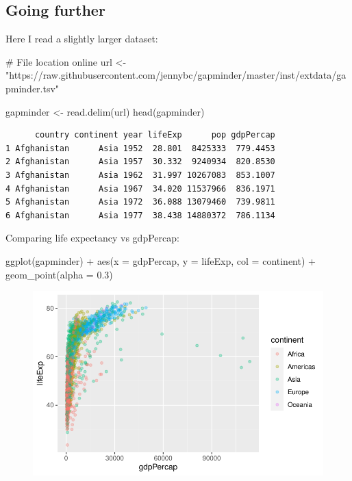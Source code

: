 \documentclass[
  letterpaper,
  DIV=11,
  numbers=noendperiod]{scrartcl}
\newenvironment{Shaded}{\begin{snugshade}}{\end{snugshade}}
\newcommand{\AttributeTok}[1]{\textcolor[rgb]{0.40,0.45,0.13}{#1}}
\newcommand{\CommentTok}[1]{\textcolor[rgb]{0.37,0.37,0.37}{#1}}
\newcommand{\FloatTok}[1]{\textcolor[rgb]{0.68,0.00,0.00}{#1}}
\newcommand{\FunctionTok}[1]{\textcolor[rgb]{0.28,0.35,0.67}{#1}}
\newcommand{\NormalTok}[1]{\textcolor[rgb]{0.00,0.23,0.31}{#1}}
\newcommand{\OtherTok}[1]{\textcolor[rgb]{0.00,0.23,0.31}{#1}}
\newcommand{\SpecialCharTok}[1]{\textcolor[rgb]{0.37,0.37,0.37}{#1}}
\newcommand{\StringTok}[1]{\textcolor[rgb]{0.13,0.47,0.30}{#1}}
\begin{document}
\hypertarget{going-further}{%
\subsection{Going further}\label{going-further}}

Here I read a slightly larger dataset:

\begin{Shaded}
\begin{Highlighting}[]
\CommentTok{\# File location online}
\NormalTok{url }\OtherTok{\textless{}{-}} \StringTok{"https://raw.githubusercontent.com/jennybc/gapminder/master/inst/extdata/gapminder.tsv"}

\NormalTok{gapminder }\OtherTok{\textless{}{-}} \FunctionTok{read.delim}\NormalTok{(url)}
\FunctionTok{head}\NormalTok{(gapminder)}
\end{Highlighting}
\end{Shaded}

\begin{verbatim}
      country continent year lifeExp      pop gdpPercap
1 Afghanistan      Asia 1952  28.801  8425333  779.4453
2 Afghanistan      Asia 1957  30.332  9240934  820.8530
3 Afghanistan      Asia 1962  31.997 10267083  853.1007
4 Afghanistan      Asia 1967  34.020 11537966  836.1971
5 Afghanistan      Asia 1972  36.088 13079460  739.9811
6 Afghanistan      Asia 1977  38.438 14880372  786.1134
\end{verbatim}

Comparing life expectancy vs gdpPercap:

\begin{Shaded}
\begin{Highlighting}[]
\FunctionTok{ggplot}\NormalTok{(gapminder) }\SpecialCharTok{+}
  \FunctionTok{aes}\NormalTok{(}\AttributeTok{x =}\NormalTok{ gdpPercap, }\AttributeTok{y =}\NormalTok{ lifeExp, }\AttributeTok{col =}\NormalTok{ continent) }\SpecialCharTok{+}
  \FunctionTok{geom\_point}\NormalTok{(}\AttributeTok{alpha =} \FloatTok{0.3}\NormalTok{)}
\end{Highlighting}
\end{Shaded}

\begin{figure}[H]

{\centering \includegraphics{class05_files/figure-pdf/unnamed-chunk-13-1.pdf}

}

\end{figure}
\end{document}
